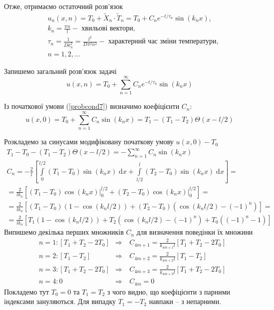 \documentclass[a4paper, 14pt]{extreport}
\begin{document}
Отже, отримаємо остаточний розв'язок
\begin{equation}
    \begin{aligned}
        \;&u_n(x,n) = T_0 + \widetilde{X}_n \cdot \widetilde{T}_n = T_0 + C_n e^{-t/\tau_n} \sin(k_n x),\\
        &k_n = \frac{\pi n}{l} - \text{ хвильові вектори}, \\
        &\tau_n = \frac{1}{D k_n^2} = \frac{l^2}{D \pi^2 n^2} - \text{ характерний час зміни температури}, \\
        &n = 1, 2,\ldots
    \end{aligned}
\end{equation}

Запишемо загальний розв'язок задачі
\begin{equation}
    u(x,n) = T_0 + \sum_{n=1}^{\infty}C_n e^{-t/\tau_n} \sin(k_n x)
\end{equation}

Із початкової умови (\ref{probcond7}) визначимо коефіцієнти $C_n$:
\begin{equation}
    u(x,0) = T_0 + \sum_{n=1}^{\infty}C_n \sin(k_n x) =  T_1 - (T_1 - T_2)\Theta(x - l/2)
\end{equation}

Розкладемо за синусами модифіковану початкову умову $u(x,0) - T_0$ 
\begin{equation*}
    \begin{gathered}
        T_1 - T_0 - (T_1 - T_2)\Theta(x - l/2) = - \sum_{n=1}^{\infty}C_n \sin(k_n x)\\
        C_n = -\frac{2}{l}\left[\int\limits_0^{l/2} (T_1 - T_0)\sin(k_n x) \;\mathrm{d}x + \int\limits_{l/2}^l (T_2 - T_0)\sin(k_n x) \;\mathrm{d}x\right] =\\
        = \frac{2}{lk_n}\left[(T_1 - T_0)\cos(k_n x)\biggr\rvert_0^{l/2} + (T_2 - T_0)\cos(k_n x)\biggr\rvert_0^{l/2}\right] =\\
        = \frac{2}{lk_n}\left[(T_1 - T_0)(1 - \cos(k_n l/2)) + (T_2 - T_0)(\cos(k_n l/2) - (-1)^n)\right] =\\
        = \frac{2}{lk_n}\left[T_1(1 - \cos(k_n l/2)) + T_2(\cos(k_n l/2) - (-1)^n) + T_0 ((-1)^n - 1)\right]
    \end{gathered}
\end{equation*}
Випишемо декілька перших множників $C_n$ для визначення поведінки їх множини
\begin{equation*}
    \begin{aligned}
        &n=1: \left[T_1 + T_2 - 2T_0 \right] &\Rightarrow&\ C_{4m+1} = \frac{2}{k_{4m+1}l}\left[T_1 + T_2 - 2T_0 \right]\\
        &n=2: \left[T_1 - T_2 \right] &\Rightarrow&\ C_{4m+2} = \frac{2}{k_{4m+2}l}\left[T_1 - T_2 \right]\\
        &n=3: \left[T_1 + T_2 - 2T_0 \right] &\Rightarrow&\ C_{4m+3} = \frac{2}{k_{4m+3}l}\left[T_1 + T_2 - 2T_0 \right]\\
        &n=4: 0 &\Rightarrow&\ C_{4m} = 0
    \end{aligned}    
\end{equation*}
Покладемо тут $T_0 = 0$ та $T_1 = T_2$ з чого видно, що коефіцієнти з парними індексами зануляються. Для випадку $T_1 = -T_2$ навпаки -- з непарними.
\end{document}
